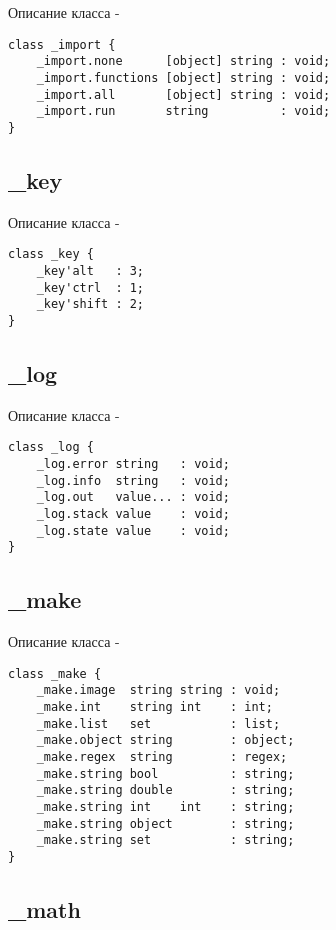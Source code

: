 \noindent Описание класса  -
\begin{lstlisting}[numbers=none]
class _import {
	_import.none      [object] string : void;
	_import.functions [object] string : void;
	_import.all       [object] string : void;
	_import.run       string          : void;
}
\end{lstlisting}

\subsection{{\color{orange} \_key}}

\noindent Описание класса  -
\begin{lstlisting}[numbers=none]
class _key {
	_key'alt   : 3;
	_key'ctrl  : 1;
	_key'shift : 2;
}
\end{lstlisting}

\subsection{{\color{orange} \_log}}

\noindent Описание класса  -
\begin{lstlisting}[numbers=none]
class _log {
	_log.error string   : void;
	_log.info  string   : void;
	_log.out   value... : void;
	_log.stack value    : void;
	_log.state value    : void;
}
\end{lstlisting}

\subsection{{\color{orange} \_make}}

\noindent Описание класса  -
\begin{lstlisting}[numbers=none]
class _make {
	_make.image  string string : void;
	_make.int    string int    : int;
	_make.list   set           : list;
	_make.object string        : object;
	_make.regex  string        : regex;
	_make.string bool          : string;
	_make.string double        : string;
	_make.string int    int    : string;
	_make.string object        : string;
	_make.string set           : string;
}
\end{lstlisting}

\subsection{{\color{orange} \_math}}

